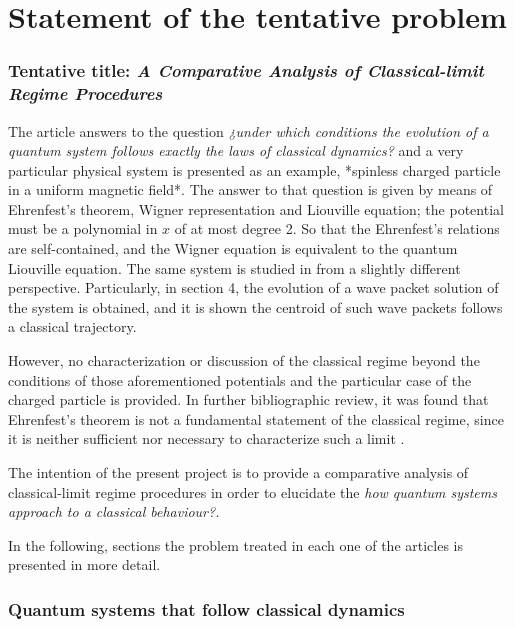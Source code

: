 \chapter{Statement of the tentative problem}

\subsection*{Tentative title: \emph{A Comparative Analysis of Classical-limit Regime Procedures}}

The article \cite{manfrediQuantumSystemsThat1993} answers to the question \emph{¿under which conditions the evolution of a quantum system follows exactly the laws of classical dynamics?} and a very particular physical system is presented as an example, *spinless charged particle in a uniform magnetic field*. The answer to that question is given by means of Ehrenfest’s theorem, Wigner representation and Liouville equation; the potential must be a polynomial in $x$ of at most degree 2. So that the Ehrenfest’s relations are self-contained, and the Wigner equation is equivalent to the quantum Liouville equation. The same system is studied in \cite{britoParticleUniformMagnetic2007} from a slightly different perspective. Particularly, in section 4, the evolution of a wave packet solution of the system is obtained, and it is shown the centroid of such wave packets follows a classical trajectory.

However, no characterization or discussion of the classical regime beyond the conditions of those aforementioned potentials and the particular case of the charged particle is provided. In further bibliographic review, it was found that Ehrenfest’s theorem is not a fundamental statement of the classical regime, since it is neither sufficient nor necessary to characterize such a limit \cite{ballentineInadequacyEhrenfestTheorem1994}.

The intention of the present project is to provide a comparative analysis of classical-limit regime procedures in order to elucidate the \emph{how quantum systems approach to a classical behaviour?.}

In the following, sections the problem treated in each one of the articles is presented in more detail.

\subsection*{Quantum systems that follow classical dynamics \cite{manfrediQuantumSystemsThat1993}}

